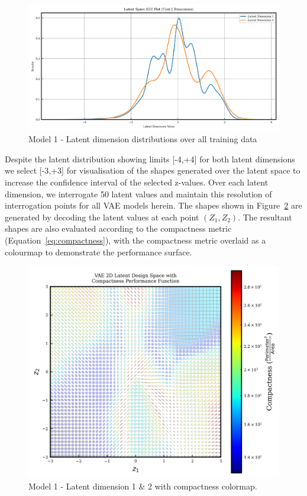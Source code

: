 \documentclass{article}
\begin{document}
\begin{figure}[H]
    \centering
    \includegraphics[width=0.75\linewidth]{figures/VAEmodels/model1/latent_distribution.png}
    \caption{Model 1 - Latent dimension distributions over all training data}
    \label{fig:model1_latent_dist}
\end{figure}

Despite the latent distribution showing limits [-4,+4] for both latent dimensions we select [-3,+3] for visualisation of the shapes generated over the latent space to increase the confidence interval of the selected z-values. Over each latent dimension, we interrogate 50 latent values and maintain this resolution of interrogation points for all VAE models herein. The shapes shown in Figure~\ref{fig:model1_latent_visualisation} are generated by decoding the latent values at each point $(Z_1,Z_2)$. The resultant shapes are also evaluated according to the compactness metric (Equation~\eqref{eq:compactness}), with the compactness metric overlaid as a colourmap to demonstrate the performance surface.

\begin{figure}[H]
    \centering
    \includegraphics[width=0.75\linewidth]{figures/VAEmodels/model1/latent_vis_1000epochs.png}
    \caption{Model 1 - Latent dimension 1 \& 2 with compactness colormap.}
    \label{fig:model1_latent_visualisation}
\end{figure}
\end{document}
